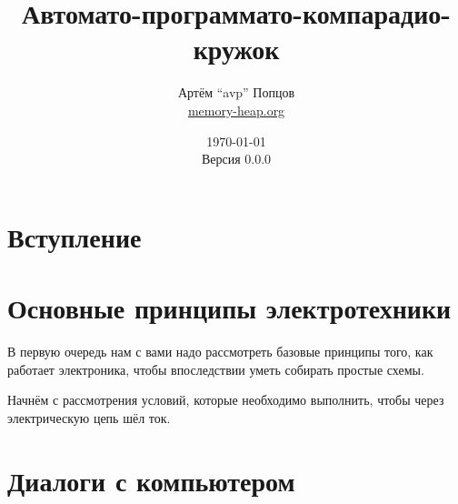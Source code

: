 \documentclass[a4paper,twoside]{book}
\title{Автомато-программато-компарадио-кружок}
\author{Артём ``avp'' Попцов\\\href{https://memory-heap.org}{memory-heap.org}}
\date{\today\\Версия 0.0.0}
\begin{document}
\maketitle

\tableofcontents

\chapter*{Вступление}



\chapter{Основные принципы электротехники}

В первую очередь нам с вами надо рассмотреть базовые принципы того, как работает
электроника, чтобы впоследствии уметь собирать простые схемы.

Начнём с рассмотрения условий, которые необходимо выполнить, чтобы через
электрическую цепь шёл ток.











\chapter{Диалоги с компьютером}
\label{chapter:dialogues-with-computer}
\end{document}

